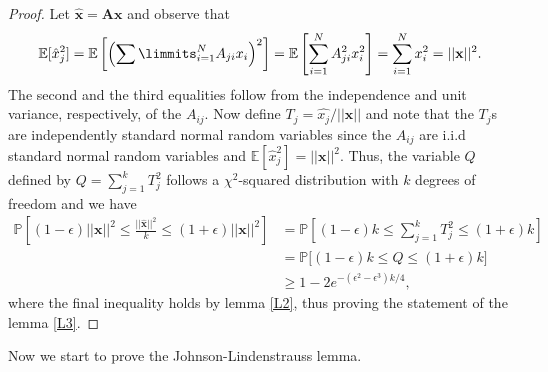 \documentclass[11pt]{article}
\begin{document}
\begin{proof}
Let $\hat{\textbf{x}}=\textbf{Ax}$ and observe that 
\[
\mathbb{E}[\hat x_j^2] = \mathbb{E}\left[\left(\sum\limmits_{i=1}^{N}A_{ji}x_i\right)^2\right] = \mathbb{E}\left[\sum\limits_{i=1}^{N}A_{ji}^2x_i^2\right] = \sum\limits_{i=1}^{N}x_i^2 = ||\textbf{x}||^2.
\]
The second and the third equalities follow from the independence and unit variance, respectively, of the $A_{ij}$. Now define $T_j=\hat{x_j}/||\textbf{x}||$ and note that the $T_j$s are independently standard normal random variables since the $A_{ij}$ are i.i.d standard normal random variables and $\mathbb{E}[\hat x_j^2] = ||\textbf{x}||^2$. Thus, the variable $Q$ defined by $Q=\sum\limits_{j=1}^{k}T_j^2$ follows a $\chi^2$-squared distribution with $k$ degrees of freedom and we have 
\begin{equation*}
    \begin{aligned}
        \mathbb{P}\left[(1-\epsilon)||\textbf{x}||^2 \leq \frac{||\hat{\textbf{x}}||^2}{k} \leq (1+\epsilon)||\textbf{x}||^2\right]
        & = \mathbb{P}\left[(1-\epsilon)k \leq \sum\limits_{j=1}^{k}T_j^2 \leq (1+\epsilon)k\right] \\
        & = \mathbb{P}\Bigg[(1-\epsilon)k \leq Q \leq (1+\epsilon)k\Bigg] \\
        & \geq 1-2e^{-(\epsilon^2-\epsilon^3)k/4},
    \end{aligned}
\end{equation*}
where the final inequality holds by lemma \ref{L2}, thus proving the statement of the lemma \ref{L3}.
\end{proof}

\noindent Now we start to prove the Johnson-Lindenstrauss lemma.
\end{document}
